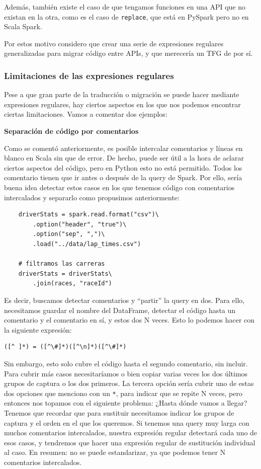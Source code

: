 \documentclass[12pt,twoside,titlepage]{report}
\newcommand{\quotes}[1]{``#1''}
\begin{document}
Además, también existe el caso de que tengamos funciones en una API que no existan en la otra, como es el caso de \texttt{replace}, que está en PySpark pero no en Scala Spark.

Por estos motivo considero que crear una serie de expresiones regulares generalizadas para migrar código entre APIs, y que merecería un TFG de por sí.

\subsubsection{Limitaciones de las expresiones regulares}

Pese a que gran parte de la traducción o migración se puede hacer mediante expresiones regulares, hay ciertos aspectos en los que nos podemos encontrar ciertas limitaciones. Vamos a comentar dos ejemplos:

\textbf{Separación de código por comentarios}

Como se comentó anteriormente, es posible intercalar comentarios y líneas en blanco en Scala sin que de error. De hecho, puede ser útil a la hora de aclarar ciertos aspectos del código, pero en Python esto no está permitido. Todos los comentario tienen que ir antes o después de la query de Spark. Por ello, sería buena idea detectar estos casos en los que tenemos código con comentarios intercalados y separarlo como propusimos anteriormente:

\begin{lstlisting}
	driverStats = spark.read.format("csv")\
		.option("header", "true")\
		.option("sep", ",")\
		.load("../data/lap_times.csv")
	
	# filtramos las carreras
	driverStats = driverStats\
		.join(races, "raceId")
\end{lstlisting}

Es decir, buscamos detectar comentarios y \quotes{partir} la query en dos. Para ello, necesitamos guardar el nombre del DataFrame, detectar el código hasta un comentario y el comentario en sí, y estos dos N veces. Esto lo podemos hacer con la siguiente expresión:

\begin{lstlisting}
([^ ]*) = ([^\#]*)([^\n]*)([^\#]*)
\end{lstlisting}

Sin embargo, esto solo cubre el código hasta el segundo comentario, sin incluir. Para cubrir más casos necesitaríamos o bien copiar varias veces los dos últimos grupos de captura o los dos primeros. La tercera opción sería cubrir uno de estas dos opciones que menciono con un \texttt{*}, para indicar que se repite N veces, pero entonces nos topamos con el siguiente problema: ¿Hasta dónde vamos a llegar? Tenemos que recordar que para sustituir necesitamos indicar los grupos de captura y el orden en el que los queremos. Si tenemos una query muy larga con muchos comentarios intercalados, nuestra expresión regular detectará cada uno de esos casos, y tendremos que hacer una expresión regular de sustitución individual al caso. En resumen: no se puede estandarizar, ya que podemos tener N comentarios intercalados.
\end{document}
